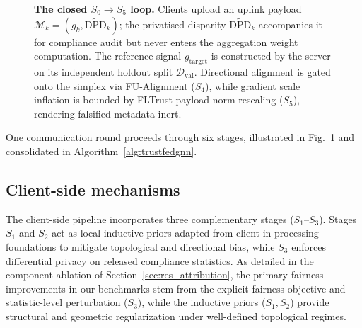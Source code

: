 \documentclass[preprint,12pt]{elsarticle}
\theoremstyle{plain}
\theoremstyle{definition}
\theoremstyle{remark}
\newcommand{\dpd}{\mathrm{DPD}}
\begin{document}
\begin{figure}[t]
{%
}
\caption{\textbf{The closed $S_0 \to S_5$ loop.} Clients upload an uplink payload $\mathcal{M}_k = (g_k, \widetilde{\dpd}_k)$; the privatised disparity $\widetilde{\dpd}_k$ accompanies it for compliance audit but never enters the aggregation weight computation. The reference signal $g_{\mathrm{target}}$ is constructed by the server on its independent holdout split $\mathcal{D}_{\mathrm{val}}$. Directional alignment is gated onto the simplex via FU-Alignment ($S_4$), while gradient scale inflation is bounded by FLTrust payload norm-rescaling ($S_5$), rendering falsified metadata inert.}
\label{fig:pipeline}
\end{figure}

One communication round proceeds through six stages, illustrated in Fig.~\ref{fig:pipeline} and consolidated in Algorithm~\ref{alg:trustfedgnn}.

\subsection{Client-side mechanisms}
\label{sec:client}

The client-side pipeline incorporates three complementary stages ($S_1\text{--}S_3$). Stages $S_1$ and $S_2$ act as local inductive priors adapted from client in-processing foundations \cite{dang2026fedfairgnn} to mitigate topological and directional bias, while $S_3$ enforces differential privacy on released compliance statistics. As detailed in the component ablation of Section~\ref{sec:res_attribution}, the primary fairness improvements in our benchmarks stem from the explicit fairness objective and statistic-level perturbation ($S_3$), while the inductive priors ($S_1, S_2$) provide structural and geometric regularization under well-defined topological regimes.
\end{document}
